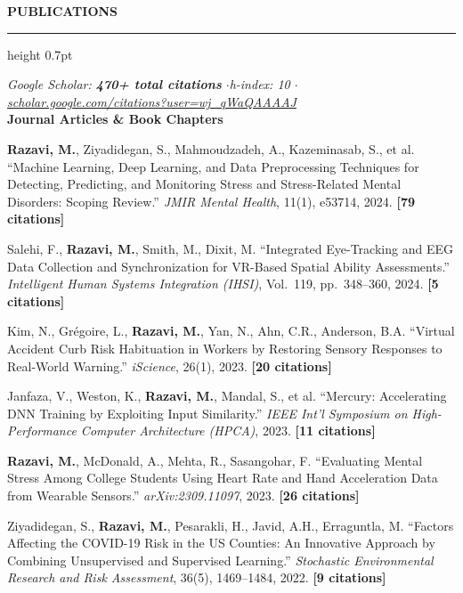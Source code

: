 \documentclass[11pt,letterpaper]{article}
\newcommand{\cvsection}[1]{%
  \vspace{0.7em}%
  {\color{headerblue}\large\bfseries\MakeUppercase{#1}}%
  \vspace{0.12em}%
  {\color{rulecolor}\hrule height 0.7pt}%
  \vspace{0.35em}%
}
\begin{document}
\cvsection{Publications}
\vspace{0.1em}
{\small\color{darktext}
\textit{Google Scholar: \textbf{470+ total citations} \enspace$\cdot$\enspace h-index: 10 \enspace$\cdot$\enspace \href{https://scholar.google.com/citations?user=wj_qWaQAAAAJ}{scholar.google.com/citations?user=wj\_qWaQAAAAJ}}
}\\[0.35em]

\noindent\textbf{\color{headerblue}Journal Articles \& Book Chapters}\\[0.15em]

{\color{darktext}\small
\begin{etaremune}[leftmargin=0.6cm, itemsep=0.12cm, topsep=0.08cm]

\item \textbf{Razavi, M.}, Ziyadidegan, S., Mahmoudzadeh, A., Kazeminasab, S., et al. ``Machine Learning, Deep Learning, and Data Preprocessing Techniques for Detecting, Predicting, and Monitoring Stress and Stress-Related Mental Disorders: Scoping Review.'' \textit{JMIR Mental Health}, 11(1), e53714, 2024. \textbf{[79 citations]}

\item Salehi, F., \textbf{Razavi, M.}, Smith, M., Dixit, M. ``Integrated Eye-Tracking and EEG Data Collection and Synchronization for VR-Based Spatial Ability Assessments.'' \textit{Intelligent Human Systems Integration (IHSI)}, Vol.~119, pp.~348--360, 2024. \textbf{[5 citations]}

\item Kim, N., Gr\'{e}goire, L., \textbf{Razavi, M.}, Yan, N., Ahn, C.R., Anderson, B.A. ``Virtual Accident Curb Risk Habituation in Workers by Restoring Sensory Responses to Real-World Warning.'' \textit{iScience}, 26(1), 2023. \textbf{[20 citations]}

\item Janfaza, V., Weston, K., \textbf{Razavi, M.}, Mandal, S., et al. ``Mercury: Accelerating DNN Training by Exploiting Input Similarity.'' \textit{IEEE Int'l Symposium on High-Performance Computer Architecture (HPCA)}, 2023. \textbf{[11 citations]}

\item \textbf{Razavi, M.}, McDonald, A., Mehta, R., Sasangohar, F. ``Evaluating Mental Stress Among College Students Using Heart Rate and Hand Acceleration Data from Wearable Sensors.'' \textit{arXiv:2309.11097}, 2023. \textbf{[26 citations]}

\item Ziyadidegan, S., \textbf{Razavi, M.}, Pesarakli, H., Javid, A.H., Erraguntla, M. ``Factors Affecting the COVID-19 Risk in the US Counties: An Innovative Approach by Combining Unsupervised and Supervised Learning.'' \textit{Stochastic Environmental Research and Risk Assessment}, 36(5), 1469--1484, 2022. \textbf{[9 citations]}


\end{etaremune}}
\end{document}
